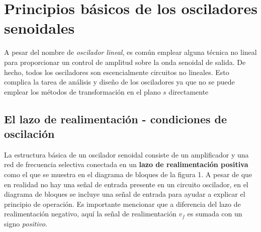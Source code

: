 \documentclass{article}
\begin{document}
\section{Principios básicos de los osciladores senoidales}
A pesar del nombre de \textit{oscilador lineal}, es común emplear alguna técnica no lineal para proporcionar un control de amplitud sobre la onda senoidal de salida. De hecho, todos los osciladores son escencialmente circuitos no lineales. Esto complica la tarea de análisis y diseño de los osciladores ya que no se puede emplear los métodos de transformación en el plano $s$ directamente 

\subsection{El lazo de realimentación - condiciones de oscilación}
La estructura básica de un oscilador senoidal consiste de un amplificador y una red de frecuencia selectiva conectada en un \textbf{lazo de realimentación positiva} como el que se muestra en el diagrama de bloques de la figura 1. A pesar de que en realidad no hay una señal de entrada presente en un circuito oscilador, en el diagrama de bloques se incluye una señal de entrada para ayudar a explicar el principio de operación. Es importante mencionar que a diferencia del lazo de realimentación negativo, aquí la señal de realimentación $v_f$ es sumada con un signo \textit{positivo}.

\begin{figure}[H]
	\centering
\caption{}	
\label{fig:figura1}
\end{figure}
\end{document}
